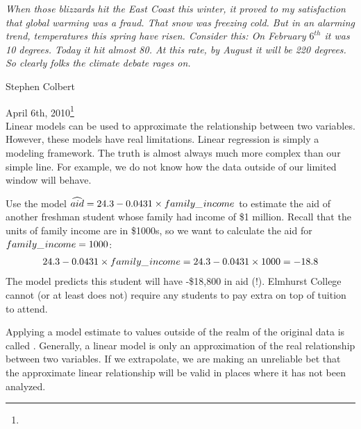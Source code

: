 
{\em\small When those blizzards hit the East Coast this winter, it proved to my satisfaction that global warming was a fraud. That snow was freezing cold. But in an alarming trend, temperatures this spring have risen. Consider this: On February $6^{th}$ it was 10 degrees. Today it hit almost 80. At this rate, by August it will be 220 degrees. So clearly folks the climate debate rages on.\vspace{0.5mm}}

\noindent\hspace{\textwidth}\hspace{-40mm}Stephen Colbert

\noindent\hspace{\textwidth}\hspace{-40mm}April 6th, 2010\footnote{} \\

Linear models can be used to approximate the relationship between two variables. However, these models have real limitations. Linear regression is simply a modeling framework. The truth is almost always much more complex than our simple line. For example, we do not know how the data outside of our limited window will behave.

\begin{example}{Use the model $\widehat{aid} = 24.3 - 0.0431\times family\_\hspace{0.3mm}income$ to estimate the aid of another freshman student whose family had income of \$1 million.}
Recall that the units of family income are in \$1000s, so we want to calculate the aid for $family\_\hspace{0.3mm}income = 1000$:
\begin{align*}
24.3 - 0.0431\times family\_\hspace{0.3mm}income  = 24.3 - 0.0431\times 1000 = -18.8
\end{align*}
The model predicts this student will have -\$18,800 in aid (!). Elmhurst College cannot (or at least does not) require any students to pay extra on top of tuition to attend.
\end{example}

Applying a model estimate to values outside of the realm of the original data is called . Generally, a linear model is only an approximation of the real relationship between two variables. If we extrapolate, we are making an unreliable bet that the approximate linear relationship will be valid in places where it has not been analyzed.

